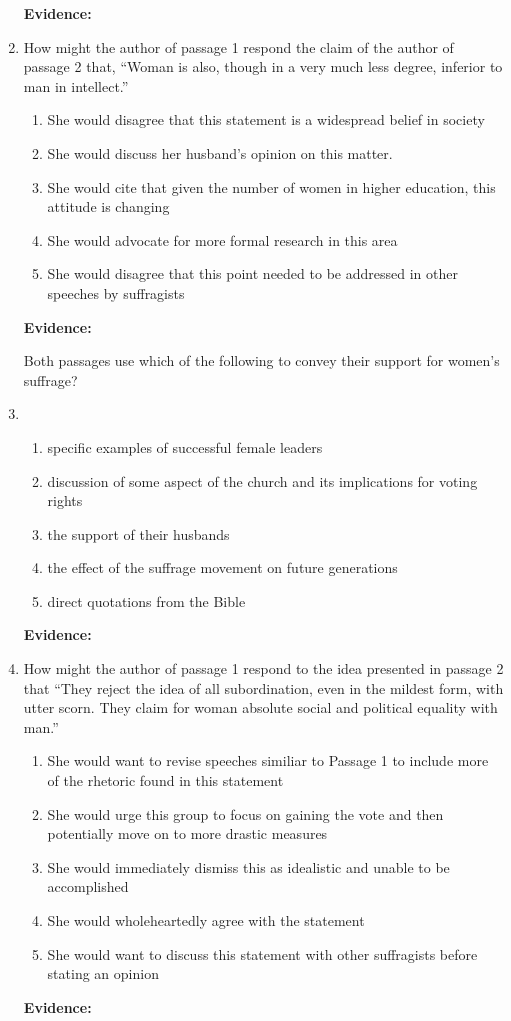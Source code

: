 \begin{enumerate}
\bigskip
\textbf{Evidence:} \hrulefill


\bigskip
\item How might the author of passage 1 respond the claim of the author of passage 2 that, ``Woman is also, though in a very much less degree, inferior to man in intellect.''

\bigskip
\begin{enumerate}[label=(\Alph*)]
\item She would disagree that this statement is a widespread belief in society
\item She would discuss her husband's opinion on this matter. 
\item She would cite that given the number of women in higher education, this attitude is changing
\item She would advocate for more formal research in this area
\item She would disagree that this point needed to be addressed in other speeches by suffragists
\end{enumerate}

\bigskip
\textbf{Evidence:} \hrulefill

\bigskip Both passages use which of the following to convey their support for women's suffrage?
\item 

\bigskip
\begin{enumerate}[label=(\Alph*)]
\item specific examples of successful female leaders
\item discussion of some aspect of the church and its implications for voting rights
\item the support of their husbands 
\item the effect of the suffrage movement on future generations
\item direct quotations from the Bible
\end{enumerate}

\bigskip
\textbf{Evidence:} \hrulefill

\bigskip
\item How might the author of passage 1 respond to the idea presented in passage 2 that ``They reject the idea of all subordination, even in the mildest form, with utter scorn. They claim for woman absolute social and political equality with man.''

\bigskip
\begin{enumerate}[label=(\Alph*)]
\item She would want to revise speeches similiar to Passage 1 to include more of the rhetoric found in this statement
\item She would urge this group to focus on gaining the vote and then potentially move on to more drastic measures
\item She would immediately dismiss this as idealistic and unable to be accomplished
\item She would wholeheartedly agree with the statement
\item She would want to discuss this statement with other suffragists before stating an opinion
\end{enumerate}

\bigskip
\textbf{Evidence:} \hrulefill

\end{enumerate}

